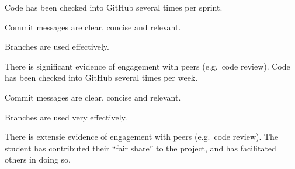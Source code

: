 \documentclass{../fal_assignment}
\begin{document}
\begin{markingrubric}
        \grade Code has been checked into GitHub several times per sprint.
            \par Commit messages are clear, concise and relevant.
            \par Branches are used effectively.
            \par There is significant evidence of engagement with peers (e.g.\ code review).
        \grade Code has been checked into GitHub several times per week.
            \par Commit messages are clear, concise and relevant.
            \par Branches are used very effectively.
            \par There is extensie evidence of engagement with peers (e.g.\ code review).
%
        \grade The student has contributed their ``fair share'' to the project,
            and has facilitated others in doing so.
\end{markingrubric}
\end{document}
